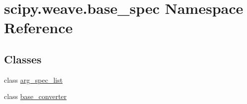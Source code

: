 \hypertarget{namespacescipy_1_1weave_1_1base__spec}{}\section{scipy.\+weave.\+base\+\_\+spec Namespace Reference}
\label{namespacescipy_1_1weave_1_1base__spec}
\subsection*{Classes}
\begin{DoxyCompactItemize}
\item 
class \hyperlink{classscipy_1_1weave_1_1base__spec_1_1arg__spec__list}{arg\+\_\+spec\+\_\+list}
\item 
class \hyperlink{classscipy_1_1weave_1_1base__spec_1_1base__converter}{base\+\_\+converter}
\end{DoxyCompactItemize}
